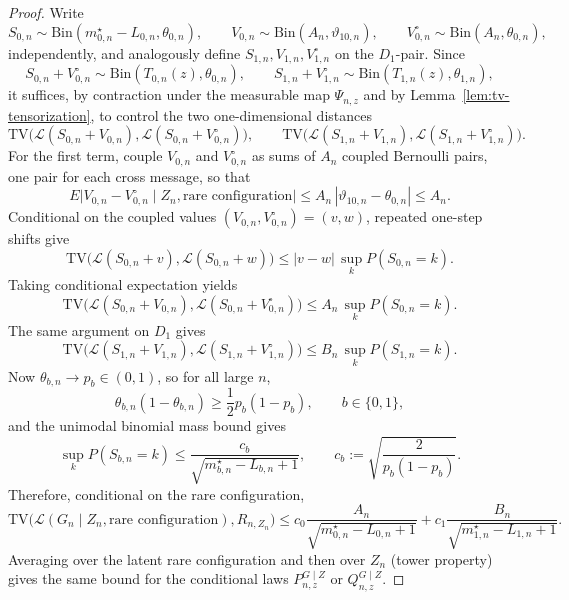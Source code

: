 \documentclass[10pt,a4paper]{amsart}
\begin{document}
\begin{proof}
Write
\[
S_{0,n}\sim \mathrm{Bin}(m_{0,n}^\star-L_{0,n},\theta_{0,n}),
\qquad
V_{0,n}\sim \mathrm{Bin}(A_n,\vartheta_{10,n}),
\qquad
V_{0,n}^\circ\sim \mathrm{Bin}(A_n,\theta_{0,n}),
\]
independently, and analogously define $S_{1,n},V_{1,n},V_{1,n}^\circ$ on the $D_1$-pair. Since
\[
S_{0,n}+V_{0,n}^\circ\sim \mathrm{Bin}(T_{0,n}(z),\theta_{0,n}),
\qquad
S_{1,n}+V_{1,n}^\circ\sim \mathrm{Bin}(T_{1,n}(z),\theta_{1,n}),
\]
it suffices, by contraction under the measurable map $\Psi_{n,z}$ and by Lemma~\ref{lem:tv-tensorization}, to control the two one-dimensional distances
\[
\mathrm{TV}\bigl(\mathcal L(S_{0,n}+V_{0,n}),\mathcal L(S_{0,n}+V_{0,n}^\circ)\bigr),
\qquad
\mathrm{TV}\bigl(\mathcal L(S_{1,n}+V_{1,n}),\mathcal L(S_{1,n}+V_{1,n}^\circ)\bigr).
\]
For the first term, couple $V_{0,n}$ and $V_{0,n}^\circ$ as sums of $A_n$ coupled Bernoulli pairs, one pair for each cross message, so that
\[
E\bigl|V_{0,n}-V_{0,n}^\circ\mid Z_n,\text{rare configuration}\bigr|
\le A_n\,|\vartheta_{10,n}-\theta_{0,n}|
\le A_n.
\]
Conditional on the coupled values $(V_{0,n},V_{0,n}^\circ)=(v,w)$, repeated one-step shifts give
\[
\mathrm{TV}\bigl(\mathcal L(S_{0,n}+v),\mathcal L(S_{0,n}+w)\bigr)
\le |v-w|\,\sup_k P(S_{0,n}=k).
\]
Taking conditional expectation yields
\[
\mathrm{TV}\bigl(\mathcal L(S_{0,n}+V_{0,n}),\mathcal L(S_{0,n}+V_{0,n}^\circ)\bigr)
\le A_n\,\sup_k P(S_{0,n}=k).
\]
The same argument on $D_1$ gives
\[
\mathrm{TV}\bigl(\mathcal L(S_{1,n}+V_{1,n}),\mathcal L(S_{1,n}+V_{1,n}^\circ)\bigr)
\le B_n\,\sup_k P(S_{1,n}=k).
\]
Now $\theta_{b,n}\to p_b\in(0,1)$, so for all large $n$,
\[
\theta_{b,n}(1-\theta_{b,n})\ge \frac12 p_b(1-p_b),
\qquad b\in\{0,1\},
\]
and the unimodal binomial mass bound gives
\[
\sup_k P(S_{b,n}=k)
\le \frac{c_b}{\sqrt{m_{b,n}^\star-L_{b,n}+1}},
\qquad
c_b:=\sqrt{\frac{2}{p_b(1-p_b)}}.
\]
Therefore, conditional on the rare configuration,
\begin{equation}
\mathrm{TV}\bigl(\mathcal L(G_n\mid Z_n,\text{rare configuration}),R_{n,Z_n}\bigr)
\le c_0\frac{A_n}{\sqrt{m_{0,n}^\star-L_{0,n}+1}}+c_1\frac{B_n}{\sqrt{m_{1,n}^\star-L_{1,n}+1}}.
\label{eq:B3-conditional-bound}
\end{equation}
Averaging over the latent rare configuration and then over $Z_n$ (tower property) gives the same bound for the conditional laws $P_{n,z}^{G\mid Z}$ or $Q_{n,z}^{G\mid Z}$.


\end{proof}
\end{document}
